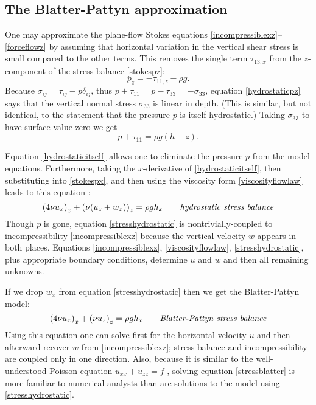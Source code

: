 \documentclass[letterpaper,final,12pt,reqno]{amsart}
\begin{document}
\subsection*{The Blatter-Pattyn approximation}  One may approximate the plane-flow Stokes equations \eqref{incompressiblexz}--\eqref{forceflowz} by assuming that horizontal variation in the vertical shear stress is small compared to the other terms.  This removes the single term  $\tau_{13,x}$ from the $z$-component of the stress balance \eqref{stokespz}:
\begin{equation}
p_z = - \tau_{11,z} - \rho g. \label{hydrostaticpz}
\end{equation}
Because $\sigma_{ij} = \tau_{ij} - p \delta_{ij}$, thus $p + \tau_{11} = p - \tau_{33} = - \sigma_{33}$, equation \eqref{hydrostaticpz} says that the vertical normal stress $\sigma_{33}$ is linear in depth.  (This is similar, but not identical, to the statement that the pressure $p$ is itself hydrostatic.)  Taking $\sigma_{33}$ to have surface value zero we get
\begin{equation}
p + \tau_{11} = \rho g (h-z). \label{hydrostaticitself}
\end{equation}

Equation \eqref{hydrostaticitself} allows one to eliminate the pressure $p$ from the model equations.  Furthermore, taking the $x$-derivative of \eqref{hydrostaticitself}, then substituting into \eqref{stokespx}, and then using the viscosity form \eqref{viscosityflowlaw} leads to this equation \cite{GreveBlatter2009}:
\begin{equation}
\left(4 \nu u_x\right)_x + \left(\nu (u_z+w_x)\right)_z = \rho g h_x \qquad\text{\emph{hydrostatic stress balance}} \label{stresshydrostatic}
\end{equation}
Though $p$ is gone, equation \eqref{stresshydrostatic} is nontrivially-coupled to incompressibility \eqref{incompressiblexz} because the vertical velocity $w$ appears in both places.  Equations \eqref{incompressiblexz}, \eqref{viscosityflowlaw}, \eqref{stresshydrostatic}, plus appropriate boundary conditions, determine $u$ and $w$ and then all remaining unknowns.

If we drop $w_x$ from equation \eqref{stresshydrostatic} then we get the Blatter-Pattyn model:
\begin{equation}
\left(4 \nu u_x\right)_x + \left(\nu u_z\right)_z = \rho g h_x \qquad\text{\emph{Blatter-Pattyn stress balance}} \label{stressblatter}
\end{equation}
Using this equation one can solve first for the horizontal velocity $u$ and then afterward recover $w$ from \eqref{incompressiblexz}; stress balance and incompressibility are coupled only in one direction.  Also, because it is similar to the well-understood Poisson equation $u_{xx} + u_{zz} = f$ \cite{MortonMayers}, solving equation \eqref{stressblatter} is more familiar to numerical analysts than are solutions to the model using \eqref{stresshydrostatic}.
\end{document}
